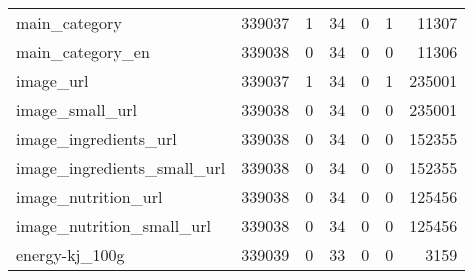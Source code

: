 \begin{tabular}{lrrrrrr}
main\_category                              &                                        339037 &                                         1 &                                            34 &                                         0 &                      1 &            11307 \\
main\_category\_en                           &                                        339038 &                                         0 &                                            34 &                                         0 &                      0 &            11306 \\
image\_url                                  &                                        339037 &                                         1 &                                            34 &                                         0 &                      1 &           235001 \\
image\_small\_url                            &                                        339038 &                                         0 &                                            34 &                                         0 &                      0 &           235001 \\
image\_ingredients\_url                      &                                        339038 &                                         0 &                                            34 &                                         0 &                      0 &           152355 \\
image\_ingredients\_small\_url                &                                        339038 &                                         0 &                                            34 &                                         0 &                      0 &           152355 \\
image\_nutrition\_url                        &                                        339038 &                                         0 &                                            34 &                                         0 &                      0 &           125456 \\
image\_nutrition\_small\_url                  &                                        339038 &                                         0 &                                            34 &                                         0 &                      0 &           125456 \\
energy-kj\_100g                             &                                        339039 &                                         0 &                                            33 &                                         0 &                      0 &             3159 \\

\end{tabular}
